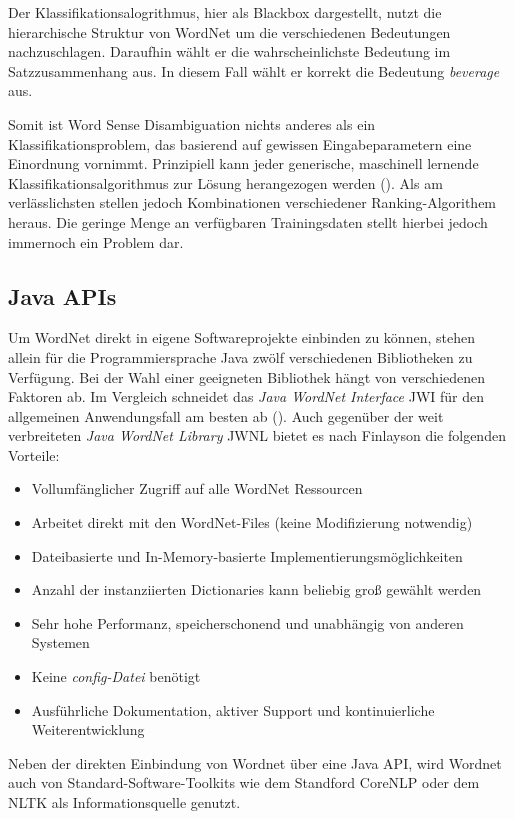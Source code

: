 Der Klassifikationsalogrithmus, hier als Blackbox dargestellt, nutzt die hierarchische Struktur von WordNet um die verschiedenen Bedeutungen nachzuschlagen. Daraufhin wählt er die wahrscheinlichste Bedeutung im Satzzusammenhang aus. In diesem Fall wählt er korrekt die Bedeutung \textit{beverage} aus.
\par
Somit ist Word Sense Disambiguation nichts anderes als ein Klassifikationsproblem, das basierend auf gewissen Eingabeparametern eine Einordnung vornimmt. Prinzipiell kann jeder generische, maschinell lernende Klassifikationsalgorithmus zur Lösung herangezogen werden (\cite[vgl.][326]{YAROWSKY}). Als am verlässlichsten stellen jedoch Kombinationen verschiedener Ranking-Algorithem heraus. Die geringe Menge an verfügbaren Trainingsdaten stellt hierbei jedoch immernoch ein Problem dar.


\subsection{Java APIs}

Um WordNet direkt in eigene Softwareprojekte einbinden zu können, stehen allein für die Programmiersprache Java zwölf verschiedenen Bibliotheken zu Verfügung. Bei der Wahl einer geeigneten Bibliothek hängt von verschiedenen Faktoren ab. Im Vergleich schneidet das \textit{Java WordNet Interface} \ac{JWI} für den allgemeinen Anwendungsfall am besten ab (\cite[vgl.][2]{FINLAYSON}). Auch gegenüber der weit verbreiteten \textit{Java WordNet Library} \ac{JWNL} bietet es nach Finlayson die folgenden Vorteile:

\begin{itemize} 
\item Vollumfänglicher Zugriff auf alle WordNet Ressourcen
\item Arbeitet direkt mit den WordNet-Files (keine Modifizierung notwendig)
\item Dateibasierte und In-Memory-basierte Implementierungsmöglichkeiten
\item Anzahl der instanziierten Dictionaries kann beliebig groß gewählt werden
\item Sehr hohe Performanz, speicherschonend und unabhängig von anderen Systemen
\item Keine \textit{config-Datei} benötigt 
\item Ausführliche Dokumentation, aktiver Support und kontinuierliche Weiterentwicklung
\end{itemize}

Neben der direkten Einbindung von Wordnet über eine Java API, wird Wordnet auch von Standard-Software-Toolkits wie dem Standford CoreNLP oder dem NLTK als Informationsquelle genutzt.